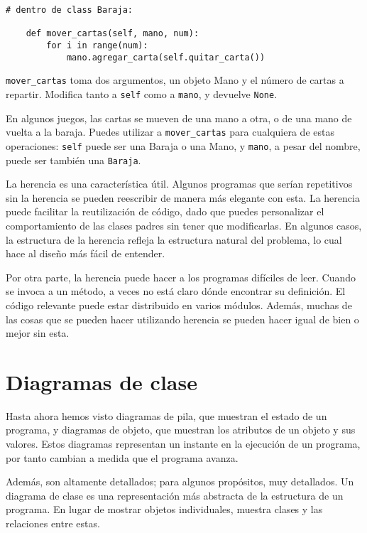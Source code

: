 \documentclass[10pt]{book}
\begin{document}

\begin{verbatim}
# dentro de class Baraja:

    def mover_cartas(self, mano, num):
        for i in range(num):
            mano.agregar_carta(self.quitar_carta())
\end{verbatim}
%
\verb"mover_cartas" toma dos argumentos, un objeto Mano y el número de
cartas a repartir.  Modifica tanto a {\tt self} como a {\tt mano}, y
devuelve {\tt None}.

En algunos juegos, las cartas se mueven de una mano a otra,
o de una mano de vuelta a la baraja.  Puedes utilizar a \verb"mover_cartas"
para cualquiera de estas operaciones: {\tt self} puede ser una Baraja
o una Mano, y {\tt mano}, a pesar del nombre, puede ser también una {\tt Baraja}.

La herencia es una característica útil.  Algunos programas que serían
repetitivos sin la herencia se pueden reescribir de manera más elegante
con esta.  La herencia puede facilitar la reutilización de código, dado que puedes
personalizar el comportamiento de las clases padres sin tener que
modificarlas.  En algunos casos, la estructura de la herencia refleja la estructura
natural del problema, lo cual hace al diseño más fácil
de entender.

Por otra parte, la herencia puede hacer a los programas difíciles de leer.
Cuando se invoca a un método, a veces no está claro dónde encontrar su
definición.  El código relevante puede estar distribuido en varios módulos.
Además, muchas de las cosas que se pueden hacer utilizando herencia se pueden
hacer igual de bien o mejor sin esta.


\section{Diagramas de clase}
\label{class.diagram}

Hasta ahora hemos visto diagramas de pila, que muestran el estado de
un programa, y diagramas de objeto, que muestran los atributos
de un objeto y sus valores.  Estos diagramas representan un instante
en la ejecución de un programa, por tanto cambian a medida que el programa
avanza.

Además, son altamente detallados; para algunos propósitos, muy
detallados.  Un diagrama de clase es una representación más abstracta
de la estructura de un programa.  En lugar de mostrar objetos
individuales, muestra clases y las relaciones entre estas.
\end{document}
